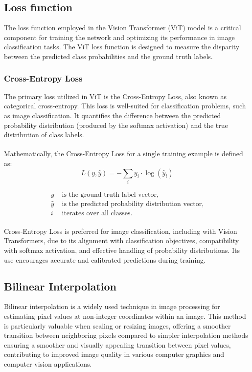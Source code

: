 \subsection{Loss function }
The loss function employed in the Vision Transformer (ViT) model is a critical component for training the network and optimizing its performance in image classification tasks. The ViT loss function is designed to measure the disparity between the predicted class probabilities and the ground truth labels.


\subsubsection{Cross-Entropy Loss}
The primary loss utilized in ViT is the Cross-Entropy Loss, also known as categorical cross-entropy. This loss is well-suited for classification problems, such as image classification. It quantifies the difference between the predicted probability distribution (produced by the softmax activation) and the true distribution of class labels.
\\
\\
Mathematically, the Cross-Entropy Loss for a single training example is defined as:
\\

\[
L(y, \hat{y}) = -\sum_i y_i \cdot \log(\hat{y}_i)
\]

\begin{align*}
y & \text{ is the ground truth label vector,} \\
\hat{y} & \text{ is the predicted probability distribution vector,} \\
i & \text{ iterates over all classes.}
\end{align*}
\\
Cross-Entropy Loss is preferred for image classification, including with Vision Transformers, due to its alignment with classification objectives, compatibility with softmax activation, and effective handling of probability distributions. Its use encourages accurate and calibrated predictions during training.
\subsection{Bilinear Interpolation }
Bilinear interpolation is a widely used technique in image processing for estimating pixel values at non-integer coordinates within an image. This method is particularly valuable when scaling or resizing images, offering a smoother transition between neighboring pixels compared to simpler interpolation methods ensuring a smoother and visually appealing transition between pixel values, contributing to improved image quality in various computer graphics and computer vision applications.   
